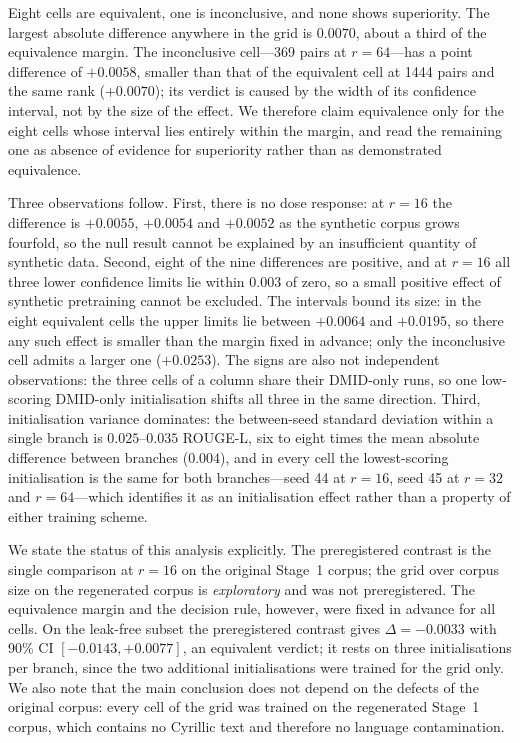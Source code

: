 \documentclass{wlscirep}
\begin{document}
Eight cells are equivalent, one is inconclusive, and none shows superiority. The largest absolute difference anywhere in the grid is $0.0070$, about a third of the equivalence margin. The inconclusive cell---369 pairs at $r=64$---has a point difference of $+0.0058$, smaller than that of the equivalent cell at 1444 pairs and the same rank ($+0.0070$); its verdict is caused by the width of its confidence interval, not by the size of the effect. We therefore claim equivalence only for the eight cells whose interval lies entirely within the margin, and read the remaining one as absence of evidence for superiority rather than as demonstrated equivalence.

Three observations follow. First, there is no dose response: at $r=16$ the difference is $+0.0055$, $+0.0054$ and $+0.0052$ as the synthetic corpus grows fourfold, so the null result cannot be explained by an insufficient quantity of synthetic data. Second, eight of the nine differences are positive, and at $r=16$ all three lower confidence limits lie within $0.003$ of zero, so a small positive effect of synthetic pretraining cannot be excluded. The intervals bound its size: in the eight equivalent cells the upper limits lie between $+0.0064$ and $+0.0195$, so there any such effect is smaller than the margin fixed in advance; only the inconclusive cell admits a larger one ($+0.0253$). The signs are also not independent observations: the three cells of a column share their DMID-only runs, so one low-scoring DMID-only initialisation shifts all three in the same direction. Third, initialisation variance dominates: the between-seed standard deviation within a single branch is $0.025$--$0.035$ ROUGE-L, six to eight times the mean absolute difference between branches ($0.004$), and in every cell the lowest-scoring initialisation is the same for both branches---seed 44 at $r=16$, seed 45 at $r=32$ and $r=64$---which identifies it as an initialisation effect rather than a property of either training scheme.

We state the status of this analysis explicitly. The preregistered contrast is the single comparison at $r=16$ on the original Stage~1 corpus; the grid over corpus size on the regenerated corpus is \emph{exploratory} and was not preregistered. The equivalence margin and the decision rule, however, were fixed in advance for all cells. On the leak-free subset the preregistered contrast gives $\Delta = -0.0033$ with 90\% CI $[-0.0143, +0.0077]$, an equivalent verdict; it rests on three initialisations per branch, since the two additional initialisations were trained for the grid only. We also note that the main conclusion does not depend on the defects of the original corpus: every cell of the grid was trained on the regenerated Stage~1 corpus, which contains no Cyrillic text and therefore no language contamination.
\end{document}
